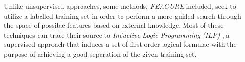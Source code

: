 \documentclass{article}
\theoremstyle{definition}
\begin{document}

Unlike unsupervised approaches, some methods, \emph{FEAGURE} included, seek to utilize a labelled training set in order to perform a more guided search through the space of possible features based on external knowledge. 
Most of these techniques can trace their source to \emph{Inductive Logic Programming (ILP)} \citep{quinlan1990learning}, a supervised approach that induces a set of first-order logical formulae with the purpose of achieving a good separation of the given training set. 

\end{document}
